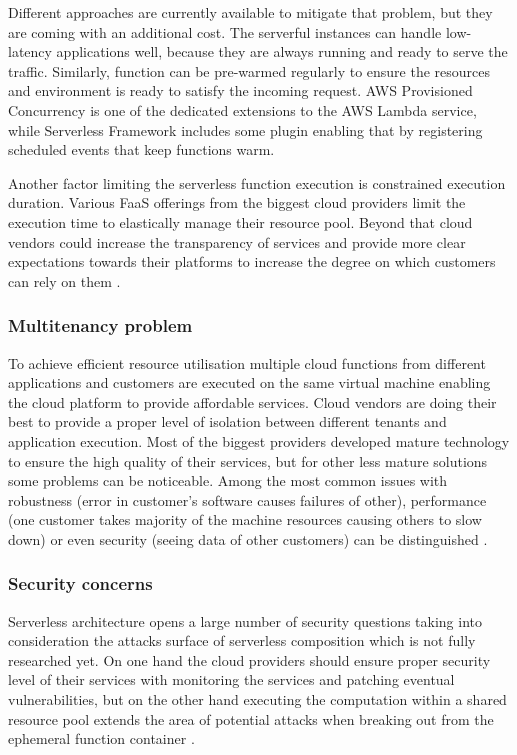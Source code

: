 Different approaches are currently available to mitigate that problem, but they are coming with an additional cost. The serverful instances can handle low-latency applications well, because they are always running and ready to serve the traffic. Similarly, function can be pre-warmed regularly to ensure the resources and environment is ready to satisfy the incoming request. AWS Provisioned Concurrency is one of the dedicated extensions to the AWS Lambda service, while Serverless Framework includes some plugin enabling that by registering scheduled events that keep functions warm.

Another factor limiting the serverless function execution is constrained execution duration. Various FaaS offerings from the biggest cloud providers limit the execution time to elastically manage their resource pool. Beyond that cloud vendors could increase the transparency of services and provide more clear expectations towards their platforms to increase the degree on which customers can rely on them \cite{MartinFowlerServerless}.

\subsubsection*{Multitenancy problem}

To achieve efficient resource utilisation multiple cloud functions from different applications and customers are executed on the same virtual machine enabling the cloud platform to provide affordable services. Cloud vendors are doing their best to provide a proper level of isolation between different tenants and application execution. Most of the biggest providers developed mature technology to ensure the high quality of their services, but for other less mature solutions some problems can be noticeable. Among the most common issues with robustness (error in customer’s software causes failures of other), performance (one customer takes majority of the machine resources causing others to slow down) or even security (seeing data of other customers) can be distinguished \cite{MartinFowlerServerless}.

\subsubsection*{Security concerns}

Serverless architecture opens a large number of security questions taking into consideration the attacks surface of serverless composition which is not fully researched yet. On one hand the cloud providers should ensure proper security level of their services with monitoring the services and patching eventual vulnerabilities, but on the other hand executing the computation within a shared resource pool extends the area of potential attacks when breaking out from the ephemeral function container \cite{LeveragingServerlessCloudComputingArchitectures}.

